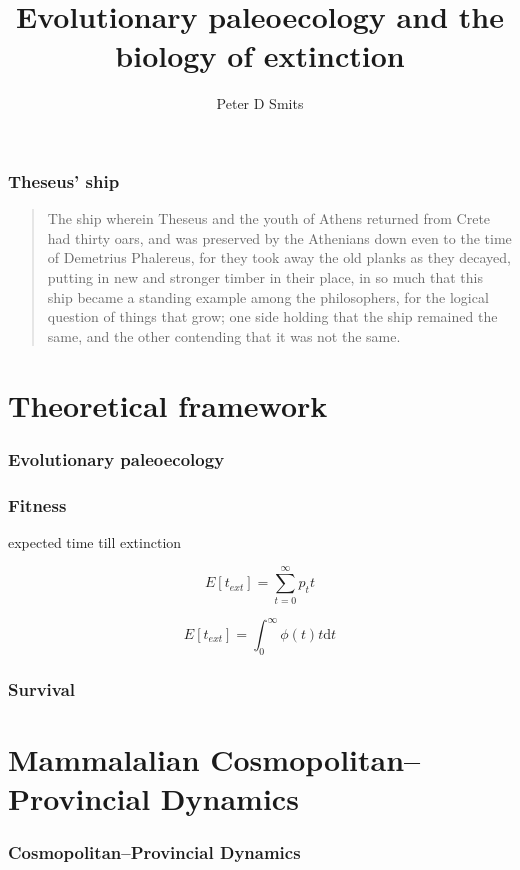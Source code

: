 \documentclass{beamer}
\title{Evolutionary paleoecology and the biology of extinction}
\author{Peter D Smits}
\institute{Committee on Evolutionary Biology, University of Chicago}
\begin{document}
\begin{frame}
  \maketitle
\end{frame}

\begin{frame}
  \tableofcontents
\end{frame}

\begin{frame}
  \frametitle{Theseus' ship}

  \begin{quotation}
    The ship wherein Theseus and the youth of Athens returned from Crete had thirty oars, and was preserved by the Athenians down even to the time of Demetrius Phalereus, for they took away the old planks as they decayed, putting in new and stronger timber in their place, in so much that this ship became a standing example among the philosophers, for the logical question of things that grow; one side holding that the ship remained the same, and the other contending that it was not the same.

  \end{quotation}

\end{frame}


\section{Theoretical framework}
\begin{frame}
  \frametitle{Evolutionary paleoecology}

\end{frame}

\begin{frame}
  \frametitle{Fitness}

  expected time till extinction

  \begin{equation}
    E[t_{ext}] = \sum_{t = 0}^{\infty} p_{t} t
  \end{equation}

  \begin{equation}
    E[t_{ext}] = \int_{0}^{\infty} \phi(t) t \mathrm{d}t
  \end{equation}

\end{frame}

\begin{frame}
  \frametitle{Survival}

\end{frame}


\section{Mammalalian Cosmopolitan--Provincial Dynamics}
\begin{frame}
  \frametitle{Cosmopolitan--Provincial Dynamics}
\end{frame}
%
%
%
\end{document}
